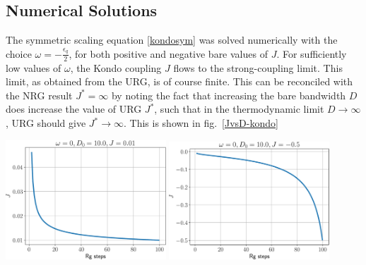 \documentclass[twoside,11pt]{report}
\numberwithin{equation}{section}
\begin{document}
\subsection{Numerical Solutions}
The symmetric scaling equation \ref{kondosym} was solved numerically with the choice \(\omega = -\frac{\epsilon_q}{2}\), for both positive and negative bare values of \(J\). For sufficiently low values of \(\omega\), the Kondo coupling \(J\) flows to the strong-coupling limit. This limit, as obtained from the URG, is of course finite. This can be reconciled with the NRG result \(J^* = \infty\) by noting the fact that increasing the bare bandwidth \(D\) does increase the value of URG \(J^*\), such that in the thermodynamic limit \(D \to \infty\), URG should give \(J^* \to \infty\). This is shown in fig.~\ref{JvsD-kondo}
\begin{center}
	\includegraphics[width=0.45\textwidth]{../figures/relJ.pdf}
	\hspace*{\fill}
	\includegraphics[width=0.45\textwidth]{../figures/rel2J.pdf}
\end{center}
\end{document}
